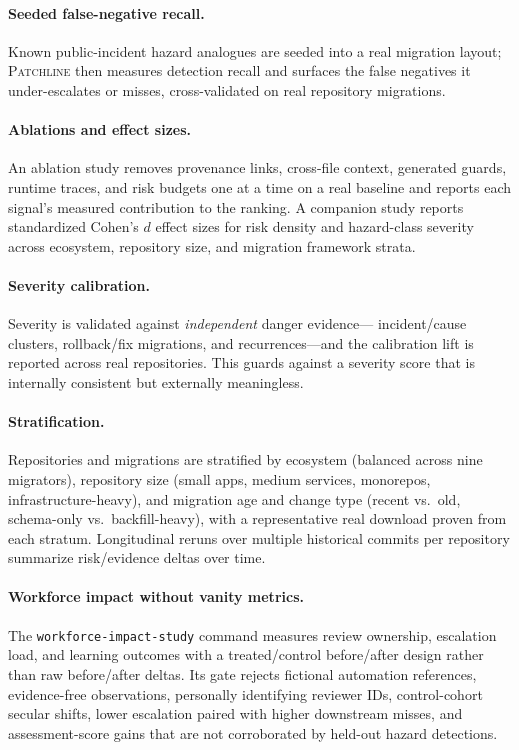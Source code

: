 \documentclass[11pt]{article}
\newcommand{\tool}{\textsc{Patchline}}
\newcommand{\code}[1]{\texttt{#1}}
\begin{document}
\paragraph{Seeded false-negative recall.} Known public-incident hazard analogues are seeded into a
real migration layout; \tool{} then measures detection recall and surfaces the false negatives it
under-escalates or misses, cross-validated on real repository migrations.

\paragraph{Ablations and effect sizes.} An ablation study removes provenance links, cross-file
context, generated guards, runtime traces, and risk budgets one at a time on a real baseline and
reports each signal's measured contribution to the ranking. A companion study reports standardized
Cohen's $d$ effect sizes for risk density and hazard-class severity across ecosystem, repository
size, and migration framework strata.

\paragraph{Severity calibration.} Severity is validated against \emph{independent} danger evidence---
incident/cause clusters, rollback/fix migrations, and recurrences---and the calibration lift is
reported across real repositories. This guards against a severity score that is internally consistent
but externally meaningless.

\paragraph{Stratification.} Repositories and migrations are stratified by ecosystem (balanced across
nine migrators), repository size (small apps, medium services, monorepos, infrastructure-heavy), and
migration age and change type (recent vs.\ old, schema-only vs.\ backfill-heavy), with a representative
real download proven from each stratum. Longitudinal reruns over multiple historical commits per
repository summarize risk/evidence deltas over time.

\paragraph{Workforce impact without vanity metrics.} The \code{workforce-impact-study} command measures
review ownership, escalation load, and learning outcomes with a treated/control before/after design
rather than raw before/after deltas. Its gate rejects fictional automation references, evidence-free
observations, personally identifying reviewer IDs, control-cohort secular shifts, lower escalation paired
with higher downstream misses, and assessment-score gains that are not corroborated by held-out hazard
detections.
\end{document}
